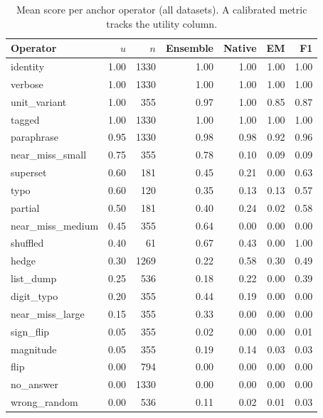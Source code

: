 \begin{table}[t]
\centering
\footnotesize
\caption{Mean score per anchor operator (all datasets). A calibrated metric tracks the utility column.}
\label{tab:probes}

\begin{tabular}{lrrrrrr}
\toprule
Operator & $u$ & $n$ & Ensemble & Native & EM & F1 \\
\midrule
identity & 1.00 & 1330 & 1.00 & 1.00 & 1.00 & 1.00 \\
verbose & 1.00 & 1330 & 1.00 & 1.00 & 1.00 & 1.00 \\
unit\_variant & 1.00 & 355 & 0.97 & 1.00 & 0.85 & 0.87 \\
tagged & 1.00 & 1330 & 1.00 & 1.00 & 1.00 & 1.00 \\
paraphrase & 0.95 & 1330 & 0.98 & 0.98 & 0.92 & 0.96 \\
near\_miss\_small & 0.75 & 355 & 0.78 & 0.10 & 0.09 & 0.09 \\
superset & 0.60 & 181 & 0.45 & 0.21 & 0.00 & 0.63 \\
typo & 0.60 & 120 & 0.35 & 0.13 & 0.13 & 0.57 \\
partial & 0.50 & 181 & 0.40 & 0.24 & 0.02 & 0.58 \\
near\_miss\_medium & 0.45 & 355 & 0.64 & 0.00 & 0.00 & 0.00 \\
shuffled & 0.40 & 61 & 0.67 & 0.43 & 0.00 & 1.00 \\
hedge & 0.30 & 1269 & 0.22 & 0.58 & 0.30 & 0.49 \\
list\_dump & 0.25 & 536 & 0.18 & 0.22 & 0.00 & 0.39 \\
digit\_typo & 0.20 & 355 & 0.44 & 0.19 & 0.00 & 0.00 \\
near\_miss\_large & 0.15 & 355 & 0.33 & 0.00 & 0.00 & 0.00 \\
sign\_flip & 0.05 & 355 & 0.02 & 0.00 & 0.00 & 0.01 \\
magnitude & 0.05 & 355 & 0.19 & 0.14 & 0.03 & 0.03 \\
flip & 0.00 & 794 & 0.00 & 0.00 & 0.00 & 0.00 \\
no\_answer & 0.00 & 1330 & 0.00 & 0.00 & 0.00 & 0.00 \\
wrong\_random & 0.00 & 536 & 0.11 & 0.02 & 0.01 & 0.03 \\
\bottomrule
\end{tabular}

\end{table}